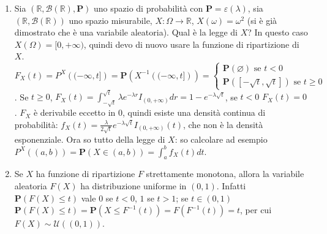 \documentclass{article}
\begin{document}
\begin{enumerate}
\item Sia $\left( 
\mathbb{R}
,\mathcal{B}\left( 
\mathbb{R}
\right) ,\mathbf{P}\right) $ uno spazio di probabilit\`{a} con $\mathbf{P}%
=\varepsilon \left( \lambda \right) $, sia $\left( 
\mathbb{R}
,\mathcal{B}\left( 
\mathbb{R}
\right) \right) $ uno spazio misurabile, $X:\Omega \rightarrow 
\mathbb{R}
$, $X\left( \omega \right) =\omega ^{2}$ (si \`{e} gi\`{a} dimostrato che 
\`{e} una variabile aleatoria). Qual \`{e} la legge di $X$? In questo caso $%
X\left( \Omega \right) =[0,+\infty )$, quindi devo di nuovo usare la
funzione di ripartizione di $X$. $F_{X}\left( t\right) =P^{X}\left( (-\infty
,t]\right) =\mathbf{P}\left( X^{-1}\left( (-\infty ,t]\right) \right)
=\left\{ 
\begin{array}{c}
\mathbf{P}\left( \varnothing \right) \text{ se }t<0 \\ 
\mathbf{P}\left( \left[ -\sqrt{t},\sqrt{t}\right] \right) \text{ se }t\geq 0%
\end{array}%
\right. $. Se $t\geq 0$, $F_{X}\left( t\right) =\int_{-\sqrt{t}}^{\sqrt{t}%
}\lambda e^{-\lambda r}I_{\left( 0,+\infty \right) }dr=1-e^{-\lambda \sqrt{t}%
}$, se $t<0$ $F_{X}\left( t\right) =0$. $F_{X}$ \`{e} derivabile eccetto in $%
0$, quindi esiste una densit\`{a} continua di probabilit\`{a}: $f_{X}\left(
t\right) =\frac{\lambda }{2\sqrt{t}}e^{-\lambda \sqrt{t}}I_{\left( 0,+\infty
\right) }\left( t\right) $, che non \`{e} la densit\`{a} esponenziale. Ora
so tutto della legge di $X$: so calcolare ad esempio $P^{X}\left( \left(
a,b\right) \right) =\mathbf{P}\left( X\in \left( a,b\right) \right)
=\int_{a}^{b}f_{X}\left( t\right) dt$.

\item Se $X$ ha funzione di ripartizione $F$ strettamente monotona, allora
la variabile aleatoria $F\left( X\right) $ ha distribuzione uniforme in $%
\left( 0,1\right) $. Infatti $\mathbf{P}\left( F\left( X\right) \leq
t\right) $ vale $0$ se $t<0$, $1$ se $t>1$; se $t\in \left( 0,1\right) $ $%
\mathbf{P}\left( F\left( X\right) \leq t\right) =\mathbf{P}\left( X\leq
F^{-1}\left( t\right) \right) =F\left( F^{-1}\left( t\right) \right) =t$,
per cui $F\left( X\right) \sim \mathcal{U}\left( \left( 0,1\right) \right) $.
\end{enumerate}
\end{document}
